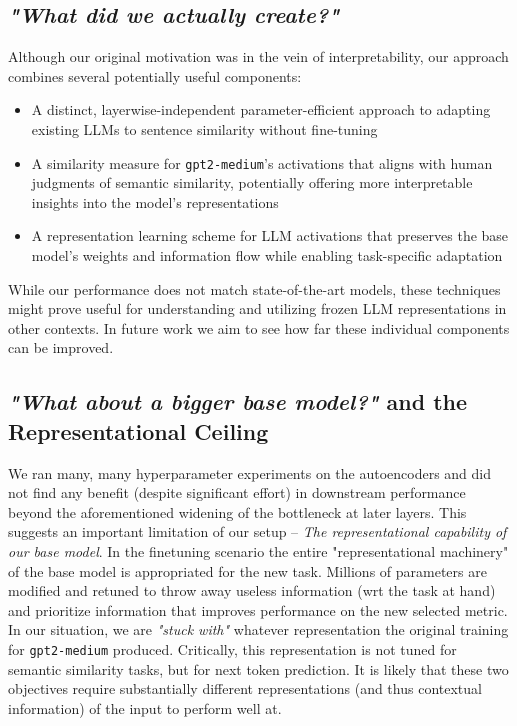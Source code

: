 \documentclass{article}
\begin{document}
\subsection{\textit{"What did we actually create?"}} \label{pathways}
Although our original motivation was in the vein of interpretability, our approach combines several potentially useful components:
\begin{itemize}
    \item A distinct, layerwise-independent parameter-efficient approach to adapting existing LLMs to sentence similarity without fine-tuning
    \item A similarity measure for \verb|gpt2-medium|'s activations that aligns with human judgments of semantic similarity, potentially offering more interpretable insights into the model's representations
    \item A representation learning scheme for LLM activations that preserves the base model's weights and information flow while enabling task-specific adaptation
\end{itemize}
While our performance does not match state-of-the-art models, these techniques might prove useful for understanding and utilizing frozen LLM representations in other contexts. In future work we aim to see how far these individual components can be improved.

\subsection{\textit{"What about a bigger base model?"} and the Representational Ceiling}
We ran many, many hyperparameter experiments on the autoencoders and did not find any benefit (despite significant effort) in downstream performance beyond the aforementioned widening of the bottleneck at later layers. This suggests an important limitation of our setup -- \textit{The representational capability of our base model}. In the finetuning scenario the entire "representational machinery" of the base model is appropriated for the new task. Millions of parameters are modified and retuned to throw away useless information (wrt the task at hand) and prioritize information that improves performance on the new selected metric. In our situation, we are \textit{"stuck with"} whatever representation the original training for \verb|gpt2-medium| produced. Critically, this representation is not tuned for semantic similarity tasks, but for next token prediction. It is likely that these two objectives require substantially different representations (and thus contextual information) of the input to perform well at.
\end{document}
